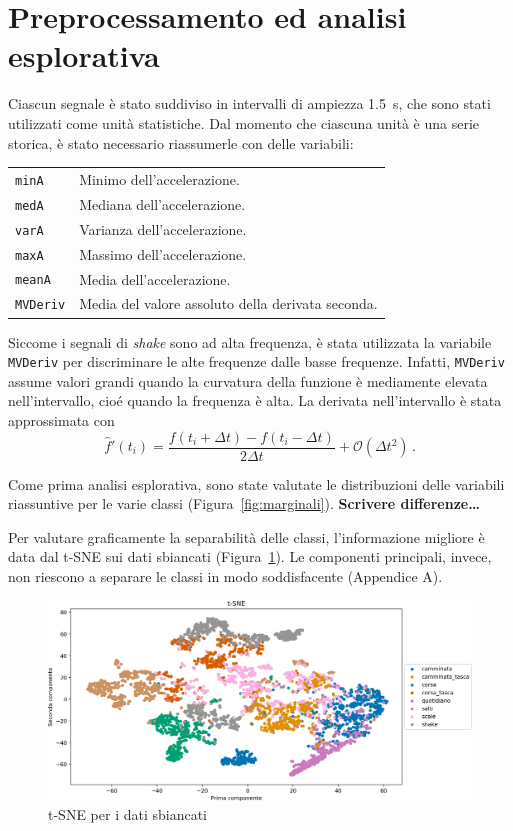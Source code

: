 \documentclass[./main.tex]{subfiles}
\begin{document}
\section{Preprocessamento ed analisi esplorativa}
Ciascun segnale è stato suddiviso in intervalli di ampiezza \SI{1.5}{s}, che sono stati utilizzati come unità statistiche. Dal momento che ciascuna unità è una serie storica, è stato necessario riassumerle con delle variabili:
\begin{table}[H]
	\centering
	\begin{tabular}{ll}
		\texttt{minA}& Minimo dell'accelerazione.\\
		\texttt{medA}& Mediana dell'accelerazione.\\
		\texttt{varA}& Varianza dell'accelerazione.\\
		\texttt{maxA}& Massimo dell'accelerazione.\\
		\texttt{meanA}& Media dell'accelerazione.\\
		\texttt{MVDeriv}& Media del valore assoluto della derivata seconda.
	\end{tabular}
\end{table}
Siccome i segnali di {\em shake} sono ad alta frequenza, è stata utilizzata la variabile \texttt{MVDeriv} per discriminare le alte frequenze dalle basse frequenze. Infatti, \texttt{MVDeriv} assume valori grandi quando la curvatura della funzione è mediamente elevata nell'intervallo, cioé quando la frequenza è alta. La derivata nell'intervallo è stata approssimata con\cite{NumpyGradientNumPy}
\[
\hat{f}'(t_i) = \dfrac{f(t_i + \Delta t) - f(t_i - \Delta t)}{2\Delta t} + \mathcal{O}(\Delta t^2)\,.
\]

Come prima analisi esplorativa, sono state valutate le distribuzioni delle variabili riassuntive per le varie classi (Figura~\ref{fig:marginali}). \textbf{Scrivere differenze\dots}

Per valutare graficamente la separabilità delle classi, l'informazione migliore è data dal t-SNE sui dati sbiancati (Figura~\ref{fig:tsne}). Le componenti principali, invece, non riescono a separare le classi in modo soddisfacente (Appendice A).
\begin{figure}[H]
	\centering
	\includegraphics[width=.8\textwidth]{../../figure/t-SNE.png}
	\caption{{ t-SNE per i dati sbiancati}}
	\label{fig:tsne}
\end{figure}
\end{document}
